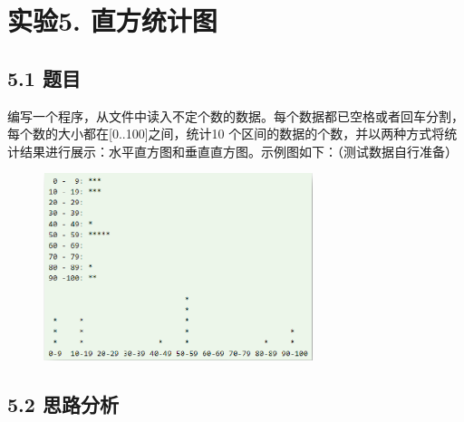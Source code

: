 \vspace{-3cm}\chapter{实验5. 直方统计图}

\section{5.1 题目}
 
编写一个程序，从文件中读入不定个数的数据。每个数据都已空格或者回车分割，每个数的大小都在[0..100]之间，统计10
个区间的数据的个数，并以两种方式将统计结果进行展示：水平直方图和垂直直方图。示例图如下：（测试数据自行准备）

\begin{figure}[H]
    \centering
    \includegraphics[width = 0.7\textwidth]{../pic/5/5.0.png}
\end{figure}

\section{5.2 思路分析}

